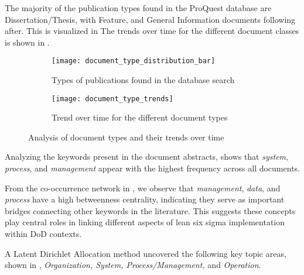 \documentclass{article}
\begin{document}
	The majority of the publication types found in the ProQuest database are Dissertation/Thesis, with Feature, and General Information documents following after.
	This is visualized in 
	The trends over time for the different document classes is shown in .

	\begin{figure}[htbp]
		\centering
		\begin{subfigure}[b]{0.48\textwidth}
			\centering
			\texttt{[image: document\_type\_distribution\_bar]}
			\caption{Types of publications found in the database search}
			\label{fig:document_type}
		\end{subfigure}
		\hfill
		\begin{subfigure}[b]{0.48\textwidth}
			\centering
			\texttt{[image: document\_type\_trends]}
			\caption{Trend over time for the different document types}
			\label{fig:document_type_trend}
		\end{subfigure}
		\caption{Analysis of document types and their trends over time}
		\label{fig:document_analysis}
	\end{figure}


	Analyzing the keywords present in the document abstracts,  shows that \textit{system}, \textit{process}, and \textit{management} appear with the highest frequency across all documents.

	From the co-occurrence network in , we observe that \textit{management}, \textit{data}, and \textit{process} have a high betweenness centrality, indicating they serve as important bridges connecting other keywords in the literature. This suggests these concepts play central roles in linking different aspects of lean six sigma implementation within DoD contexts.

	A Latent Dirichlet Allocation method uncovered the following key topic areas, shown in , \textit{Organization, System, Process/Management,} and \textit{Operation}.
\end{document}
